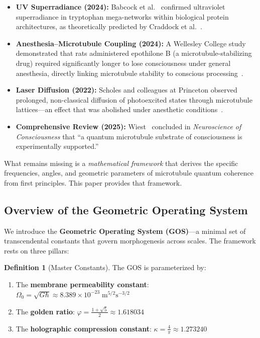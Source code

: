 \documentclass[12pt,a4paper]{article}
\theoremstyle{plain}
\theoremstyle{definition}
\newtheorem{definition}[theorem]{Definition}
\newcommand{\OmegaZero}{\Omega_0}
\newcommand{\golden}{\varphi}
\newcommand{\kap}{\kappa}
\begin{document}
\begin{itemize}
    \item \textbf{UV Superradiance (2024):} Babcock et al.~\cite{babcock2024} confirmed ultraviolet superradiance in tryptophan mega-networks within biological protein architectures, as theoretically predicted by Craddock et al.~\cite{craddock2017}.
    \item \textbf{Anesthesia--Microtubule Coupling (2024):} A Wellesley College study demonstrated that rats administered epothilone B (a microtubule-stabilizing drug) required significantly longer to lose consciousness under general anesthesia, directly linking microtubule stability to conscious processing~\cite{wellesley2024}.
    \item \textbf{Laser Diffusion (2022):} Scholes and colleagues at Princeton observed prolonged, non-classical diffusion of photoexcited states through microtubule lattices---an effect that was abolished under anesthetic conditions~\cite{scholes2022}.
    \item \textbf{Comprehensive Review (2025):} Wiest~\cite{wiest2025} concluded in \textit{Neuroscience of Consciousness} that ``a quantum microtubule substrate of consciousness is experimentally supported.''
\end{itemize}

What remains missing is a \emph{mathematical framework} that derives the specific frequencies, angles, and geometric parameters of microtubule quantum coherence from first principles. This paper provides that framework.

\subsection{Overview of the Geometric Operating System}

We introduce the \textbf{Geometric Operating System (GOS)}---a minimal set of transcendental constants that govern morphogenesis across scales. The framework rests on three pillars:

\begin{definition}[Master Constants]
\label{def:constants}
The GOS is parameterized by:
\begin{enumerate}
    \item The \textbf{membrane permeability constant}: $\OmegaZero = \sqrt{G\hbar} \approx 8.389 \times 10^{-23}\;\mathrm{m}^{5/2}\mathrm{s}^{-3/2}$
    \item The \textbf{golden ratio}: $\golden = \frac{1+\sqrt{5}}{2} \approx 1.618034$
    \item The \textbf{holographic compression constant}: $\kap = \frac{4}{\pi} \approx 1.273240$
\end{enumerate}
\end{definition}
\end{document}
